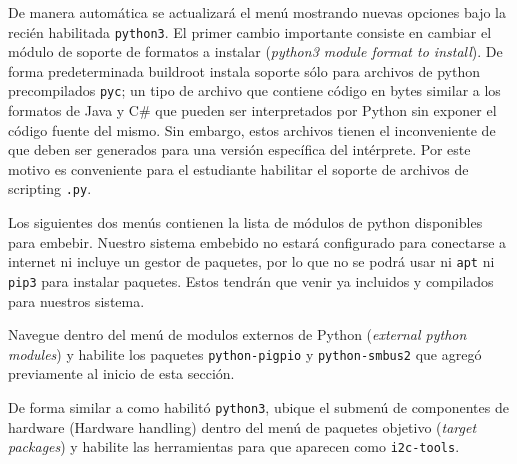 De manera automática se actualizará el menú mostrando nuevas opciones bajo la recién habilitada \texttt{python3}.
El primer cambio importante consiste en cambiar el módulo de soporte de formatos a instalar (\emph{python3 module format to install}).
De forma predeterminada buildroot instala soporte sólo para archivos de python precompilados \texttt{pyc};
un tipo de archivo que contiene código en bytes similar a los formatos de Java y C\# que pueden ser interpretados por Python sin exponer el código fuente del mismo.
Sin embargo, estos archivos tienen el inconveniente de que deben ser generados para una versión específica del intérprete.
Por este motivo es conveniente para el estudiante habilitar el soporte de archivos de scripting \texttt{.py}.

Los siguientes dos menús contienen la lista de módulos de python disponibles para embebir.
Nuestro sistema embebido no estará configurado para conectarse a internet ni incluye un gestor de paquetes, por lo que no se podrá usar ni \texttt{apt} ni \texttt{pip3} para instalar paquetes.
Estos tendrán que venir ya incluidos y compilados para nuestros sistema.

Navegue dentro del menú de modulos externos de Python (\emph{external python modules}) y habilite los paquetes \texttt{python-pigpio} y \texttt{python-smbus2} que agregó previamente al inicio de esta sección.

\medskip{}

De forma similar a como habilitó \texttt{python3}, ubique el submenú de componentes de hardware (Hardware handling) dentro del menú de paquetes objetivo (\emph{target packages})
y habilite las herramientas para \IIC{} que aparecen como \texttt{i2c-tools}.

